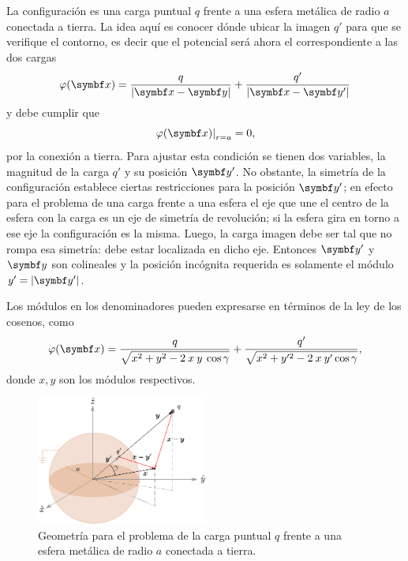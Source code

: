\documentclass[10pt,oneside]{CBFT_book}
\begin{document}

La configuración es una carga puntual $q$ frente a una esfera metálica de radio $a$ conectada a tierra.
La idea aquí es conocer dónde ubicar la imagen $ q' $ para que se verifique el contorno, es decir que
el potencial será ahora el correspondiente a las dos cargas 
\[
	\vp(\vbx) = \frac{q}{|\vbx - \vb{y}|} + \frac{q'}{|\vbx - \vb{y}'|} 
\]
y debe cumplir que 
\[
	\left. \vp(\vbx)\right|_{r=a} = 0,
\]
por la conexión a tierra. Para ajustar esta condición se tienen dos variables, la magnitud de la carga
$q'$ y su posición $\vb{y}'$.
No obstante, la simetría de la configuración establece ciertas restricciones para la posición $\vb{y}'$;
en efecto para el problema de una carga frente a una esfera el eje que une el centro de la esfera con
la carga es un eje de simetría de revolución; si la esfera gira en torno a ese eje la configuración es
la misma. Luego, la carga imagen debe ser tal que no rompa esa simetría: debe estar localizada en dicho
eje. Entonces $\vb{y}'$ y $\vb{y}$ son colineales y la posición incógnita requerida es solamente el
módulo $y'= |\vb{y}'|$.

Los módulos en los denominadores pueden expresarse en términos de la ley de los cosenos, como
\[
	\vp(\vbx) = \frac{q}{\sqrt{ x^2 + y^2 - 2 \: x \: y \:\cos{\gamma}} } +
	\frac{q'}{\sqrt{ x^2 + y'^2 - 2 \: x \: y' \cos{\gamma} }},
\]
donde $x, y$ son los módulos respectivos.

\begin{figure}[!htb]
	\begin{center}
	\includegraphics[width=0.5\textwidth]{images/fig_ft1_esfera_imagenes.pdf}
	\end{center}
	\caption{Geometría para el problema de la carga puntual $q$ frente a una esfera
	metálica de radio $a$ conectada a tierra.}
\end{figure} 
\end{document}
